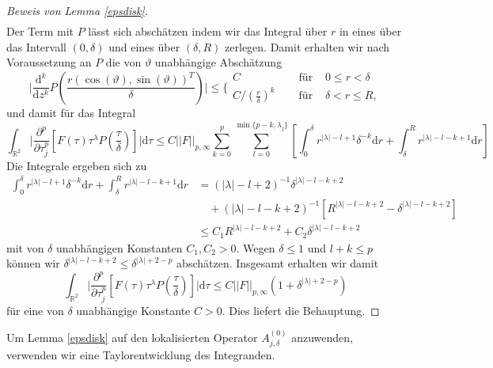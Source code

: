 \documentclass[12pt,a4paper]{scrartcl}
\newtheorem{Satz}{Satz}[section]
\newcommand{\dd}{\mathrm{d}}
\numberwithin{equation}{section}
\newcommand{\R}{\mathbb{R}} %
\newcommand{\N}{\mathbb{N}} %
\begin{document}
\begin{proof}[Beweis von Lemma \ref{epsdisk}]
\begin{align*}
\end{align*} 
Der Term mit $P$ lässt sich abschätzen indem wir das Integral über $r$ in eines über das Intervall $(0,\delta)$ und eines über $(\delta,R)$ zerlegen. 
Damit erhalten wir nach Voraussetzung an $P$ die von $\vartheta$ unabhängige Abschätzung 
\[
\bigg|\frac{\dd^k}{\dd z^k}P\left(\frac{r( \cos (\vartheta),\sin(\vartheta))^T}{\delta}\right)\bigg| \leq \bigg\lbrace
\begin{matrix}
C \quad &\text{ für } &0\leq r<\delta \\ 
C / \left(\frac{r}{\delta}\right)^k \quad &\text { für } &\delta < r \leq R,
\end{matrix}
\] und damit für das Integral
\[
\int_{\R^2} \bigg| \frac{\partial^p}{\partial \tau_j^p} \left[F(\tau) \tau^\lambda P\left(\frac{\tau}{\delta}\right) \right] \bigg| \dd \tau \leq C ||F||_{p,\infty} \sum_{k=0}^p \sum_{l=0}^{\min\{p-k,\lambda_j\}} \left[ \int_0^\delta r^{|\lambda|-l+1} \delta^{-k} \dd r + \int_\delta^R r^{|\lambda|-l-k+1} \dd r \right]
\]
Die Integrale ergeben sich zu
\begin{align*}
\int_0^\delta r^{|\lambda|-l+1} \delta^{-k} \dd r + \int_\delta^R r^{|\lambda|-l-k+1} \dd r 
&= (|\lambda| - l +2)^{-1} \delta^{|\lambda|-l-k+2}  \\ 
& \quad +(|\lambda| - l - k +2)^{-1}\left[ R^{|\lambda| - l - k + 2} - \delta^{|\lambda| - l - k + 2} \right] \\
&\leq C_1 R^{|\lambda| - l - k + 2} + C_2 \delta^{|\lambda| - l - k + 2}
\end{align*}
mit von $\delta$ unabhängigen Konstanten $C_1,C_2>0$.
Wegen $\delta \leq 1$ und $l + k \leq p$  können wir $\delta^{|\lambda| - l - k + 2} \leq \delta^{|\lambda|+2-p}$ abschätzen. Insgesamt erhalten wir damit 
\[
\int_{\R^2} \bigg| \frac{\partial^p}{\partial \tau_j^p} \left[F(\tau) \tau^\lambda P\left(\frac{\tau}{\delta}\right) \right] \bigg| \dd \tau \leq C ||F||_{p,\infty}(1 + \delta^{|\lambda|+2-p})
\]
für eine von $\delta$ unabhängige Konstante $C>0$. Dies liefert die Behauptung.
\end{proof}
Um Lemma \ref{epsdisk} auf den lokalisierten Operator $A^{(0)}_{j,\delta}$ anzuwenden, verwenden wir eine Taylorentwicklung des Integranden. 
\end{document}
